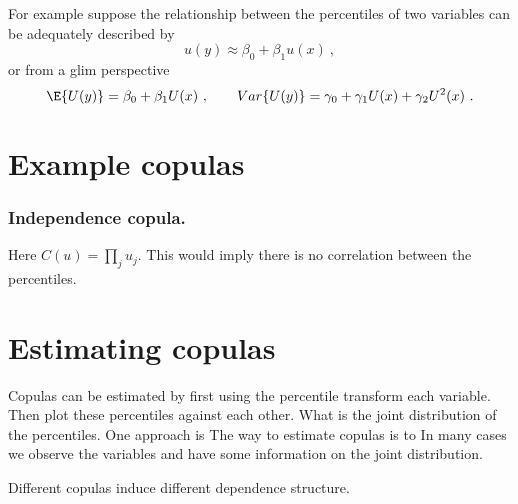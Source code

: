For example suppose the relationship between the percentiles of two variables can be adequately described by 
$$
u(y) \approx \beta_0 + \beta_1 u(x)\ ,
$$
or from a glim perspective
$$
\E\{U(y)\}=\beta_0+\beta_1 U(x) \ , \qquad Var\{U(y)\}=\gamma_0+\gamma_1 U(x)+\gamma_2 U^2(x)\ .
$$
\section{Example copulas}

\subsubsection{Independence copula.}   Here $C(u)=\prod_ju_j$.   This would imply there is no correlation between the percentiles.  

\section{Estimating copulas}

Copulas can be estimated by first using the percentile transform each variable.   Then plot these percentiles against each 
other.   What is the joint distribution of the percentiles.   One approach is  
The way to estimate copulas is to 
In many cases we observe the variables and have some information on the joint distribution.

Different copulas induce different dependence structure.   

 
